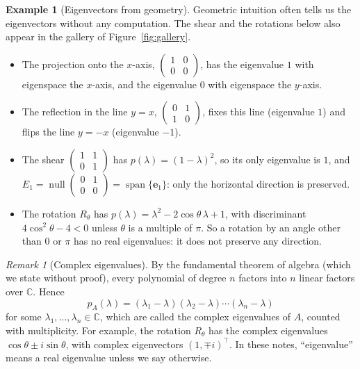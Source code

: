 \documentclass[11pt]{article}
\theoremstyle{definition}
\newtheorem{example}[definition]{Example}
\theoremstyle{plain}
\theoremstyle{remark}
\newtheorem{remark}[definition]{Remark}
\DeclareMathOperator{\Null}{null}
\DeclareMathOperator{\Span}{span}
\begin{document}
\begin{example}[Eigenvectors from geometry]\label{ex:eigen-geometric}
    Geometric intuition often tells us the eigenvectors without any computation. The shear and the rotations below also appear in the gallery of Figure~\ref{fig:gallery}.
    \begin{itemize}
        \item The projection onto the $x$-axis, $\begin{pmatrix} 1 & 0 \\ 0 & 0 \end{pmatrix}$, has the eigenvalue $1$ with eigenspace the $x$-axis, and the eigenvalue $0$ with eigenspace the $y$-axis.
        \item The reflection in the line $y = x$, $\begin{pmatrix} 0 & 1 \\ 1 & 0 \end{pmatrix}$, fixes this line (eigenvalue $1$) and flips the line $y = -x$ (eigenvalue $-1$).
        \item The shear $\begin{pmatrix} 1 & 1 \\ 0 & 1 \end{pmatrix}$ has $p(\lambda) = (1 - \lambda)^2$, so its only eigenvalue is $1$, and $E_1 = \Null \begin{pmatrix} 0 & 1 \\ 0 & 0 \end{pmatrix} = \Span\{\mathbf{e}_1\}$: only the horizontal direction is preserved.
        \item The rotation $R_\theta$ has $p(\lambda) = \lambda^2 - 2\cos\theta\, \lambda + 1$, with discriminant $4\cos^2\theta - 4 < 0$ unless $\theta$ is a multiple of $\pi$. So a rotation by an angle other than $0$ or $\pi$ has no real eigenvalues: it does not preserve any direction.
    \end{itemize}
\end{example}

\begin{remark}[Complex eigenvalues]
    By the fundamental theorem of algebra (which we state without proof), every polynomial of degree $n$ factors into $n$ linear factors over $\mathbb{C}$. Hence
    \[p_A(\lambda) = (\lambda_1 - \lambda)(\lambda_2 - \lambda) \cdots (\lambda_n - \lambda)\]
    for some $\lambda_1, \ldots, \lambda_n \in \mathbb{C}$, which are called the complex eigenvalues of $A$, counted with multiplicity. For example, the rotation $R_\theta$ has the complex eigenvalues $\cos\theta \pm i\sin\theta$, with complex eigenvectors $(1, \mp i)^\top$. In these notes, ``eigenvalue'' means a real eigenvalue unless we say otherwise.
\end{remark}
\end{document}
